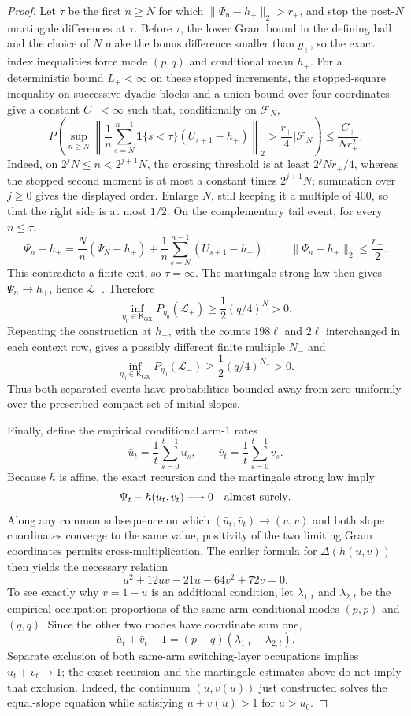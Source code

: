 \documentclass{article}
\begin{document}
\begin{proof}
Let \(\tau\) be the first \(n\ge N\) for which \(\|\Psi_n-h_+\|_2>r_+\), and stop the post-\(N\) martingale differences at \(\tau\).  Before \(\tau\), the lower Gram bound in the defining ball and the choice of \(N\) make the bonus difference smaller than \(g_+\), so the exact index inequalities force mode \((p,q)\) and conditional mean \(h_+\).  For a deterministic bound \(L_+<\infty\) on these stopped increments, the stopped-square inequality on successive dyadic blocks and a union bound over four coordinates give a constant \(C_+<\infty\) such that, conditionally on \(\mathcal F_N\),
\[
 P\!\left(
 \sup_{n\ge N}\left\|
 \frac1n\sum_{s=N}^{n-1}
 \mathbf1\{s<\tau\}(U_{s+1}-h_+)
 \right\|_2>\frac{r_+}{4}
 \mathrel{\Big|}\mathcal F_N\right)
 \le\frac{C_+}{Nr_+^2}.
\]
Indeed, on \(2^jN\le n<2^{j+1}N\), the crossing threshold is at least \(2^jNr_+/4\), whereas the stopped second moment is at most a constant times \(2^{j+1}N\); summation over \(j\ge0\) gives the displayed order.  Enlarge \(N\), still keeping it a multiple of \(400\), so that the right side is at most \(1/2\).  On the complementary tail event, for every \(n\le\tau\),
\[
 \Psi_n-h_+
 =\frac{N}{n}(\Psi_N-h_+)
 +\frac1n\sum_{s=N}^{n-1}(U_{s+1}-h_+),
 \qquad
 \|\Psi_n-h_+\|_2\le\frac{r_+}{2}.
\]
This contradicts a finite exit, so \(\tau=\infty\).  The martingale strong law then gives \(\Psi_n\to h_+\), hence \(\mathcal L_+\).  Therefore
\[
 \inf_{\eta_0\in\mathsf K_{\mathrm{GX}}}
 P_{\eta_0}(\mathcal L_+)
 \ge\frac12(q/4)^N>0.
\]
Repeating the construction at \(h_-\), with the counts \(198\ell\) and \(2\ell\) interchanged in each context row, gives a possibly different finite multiple \(N_-\) and
\[
 \inf_{\eta_0\in\mathsf K_{\mathrm{GX}}}
 P_{\eta_0}(\mathcal L_-)
 \ge\frac12(q/4)^{N_-}>0.
\]
Thus both separated events have probabilities bounded away from zero uniformly over the prescribed compact set of initial slopes.

Finally, define the empirical conditional arm-\(1\) rates
\[
 \bar u_t=\frac1t\sum_{s=0}^{t-1}u_s,
 \qquad
 \bar v_t=\frac1t\sum_{s=0}^{t-1}v_s.
\]
Because \(h\) is affine, the exact recursion and the martingale strong law imply
\[
 \Psi_t-h(\bar u_t,\bar v_t)\longrightarrow0
 \quad\hbox{almost surely}.
\]
Along any common subsequence on which \((\bar u_t,\bar v_t)\to(u,v)\) and both slope coordinates converge to the same value, positivity of the two limiting Gram coordinates permits cross-multiplication.  The earlier formula for \(\Delta(h(u,v))\) then yields the necessary relation
\[
 u^2+12uv-21u-64v^2+72v=0.
\]
To see exactly why \(v=1-u\) is an additional condition, let \(\lambda_{1,t}\) and \(\lambda_{2,t}\) be the empirical occupation proportions of the same-arm conditional modes \((p,p)\) and \((q,q)\).  Since the other two modes have coordinate sum one,
\[
 \bar u_t+\bar v_t-1=(p-q)(\lambda_{1,t}-\lambda_{2,t}).
\]
Separate exclusion of both same-arm switching-layer occupations implies \(\bar u_t+\bar v_t\to1\); the exact recursion and the martingale estimates above do not imply that exclusion.  Indeed, the continuum \((u,v(u))\) just constructed solves the equal-slope equation while satisfying \(u+v(u)>1\) for \(u>u_0\).


\end{proof}
\end{document}
